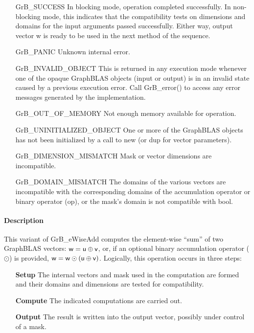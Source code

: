 \begin{itemize}[leftmargin=2.1in]
    \item[{\sf GrB\_SUCCESS}]         In blocking mode, operation
	completed successfully. In non-blocking mode, this indicates
	that the compatibility tests on dimensions and domains for the
	input arguments passed successfully. Either way, output vector
	{\sf w} is ready to be used in the next method of the sequence.

    \item[{\sf GrB\_PANIC}]           Unknown internal error.
    
    \item[{\sf GrB\_INVALID\_OBJECT}] This is returned in any execution mode 
    whenever one of the opaque GraphBLAS objects (input or output) is in an invalid 
    state caused by a previous execution error.  Call {\sf GrB\_error()} to access 
    any error messages generated by the implementation.

    \item[{\sf GrB\_OUT\_OF\_MEMORY}]        Not enough memory available for operation.
    
    \item[{\sf GrB\_UNINITIALIZED\_OBJECT}] One or more of the GraphBLAS objects 
    has not been initialized by a call to {\sf new} (or {\sf dup} for vector
    parameters).

    \item[{\sf GrB\_DIMENSION\_MISMATCH}] Mask or vector dimensions are incompatible.

	\item[{\sf GrB\_DOMAIN\_MISMATCH}]    The domains of the various
	vectors are incompatible with the corresponding domains of the
	accumulation operator or binary operator ({\sf op}), or the mask's domain 
    is not compatible with {\sf bool}.
\end{itemize}

\paragraph{Description}

This variant of {\sf GrB\_eWiseAdd} computes the element-wise ``sum'' of
two GraphBLAS vectors: ${\sf w} = {\sf u} \oplus {\sf v}$, or, if an optional
binary accumulation operator ($\odot$) is provided, ${\sf w} = {\sf w} \odot
\left({\sf u} \oplus {\sf v}\right)$.  Logically, this operation occurs in
three steps:
\begin{enumerate}[leftmargin=0.75in]
\item[\bf Setup] The internal vectors and mask used in the computation are formed 
and their domains and dimensions are tested for compatibility.
\item[\bf Compute] The indicated computations are carried out.
\item[\bf Output] The result is written into the output vector, possibly under 
control of a mask.
\end{enumerate}

